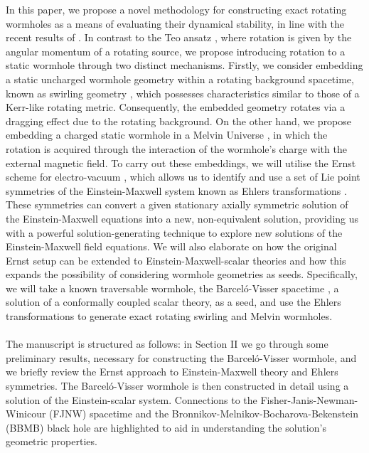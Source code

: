 \documentclass[aps,preprint,groupedaddress,nofootinbib,superscriptaddress,showkeys,showpacs,eqsecnum,amsmath,amssymb]{revtex4-1}
\begin{document}
In this paper, we propose a novel methodology for constructing exact rotating wormholes as a means of evaluating their dynamical stability, in line with the recent results of \cite{Azad:2023iju}. 
In contrast to the Teo ansatz \cite{Teo:1998dp}, where rotation is given by the angular momentum of a rotating source, we propose introducing rotation to a static wormhole through two distinct mechanisms. Firstly, we consider embedding a static uncharged wormhole geometry within a rotating background spacetime, known as swirling geometry \cite{Astorino:2022aam}, which possesses characteristics similar to those of a Kerr-like rotating metric. Consequently, the embedded geometry rotates via a dragging effect due to the rotating background. On the other hand, we propose embedding a charged static wormhole in a Melvin Universe \cite{Ernst:1976mzr}, in which the rotation is acquired through the interaction of the wormhole's charge with the external magnetic field. To carry out these embeddings, we will utilise the Ernst scheme for electro-vacuum \cite{Ernst:1967wx,Ernst:1967by}, which allows us to identify and use a set of Lie point symmetries of the Einstein-Maxwell system known as Ehlers transformations \cite{Ehlers:1957zz,Harrison:1968}. These symmetries can convert a given stationary axially symmetric solution of the Einstein-Maxwell equations into a new, non-equivalent solution, providing us with a powerful solution-generating technique to explore new solutions of the Einstein-Maxwell field equations. We will also elaborate on how the original Ernst setup can be extended to Einstein-Maxwell-scalar theories \cite{Astorino:2013xc} and how this expands the possibility of considering wormhole geometries as seeds. Specifically, we will take a known traversable wormhole, the Barcel\'o-Visser spacetime \cite{Barcelo:1999hq,Barcelo:2000zf}, a solution of a conformally coupled scalar theory, as a seed, and use the Ehlers transformations to generate exact rotating swirling and Melvin wormholes.\\
\\
The manuscript is structured as follows: in Section II we go through some preliminary results, necessary for constructing the Barcel\'o-Visser wormhole, and we briefly review the Ernst approach to Einstein-Maxwell theory and Ehlers symmetries. The Barcel\'o-Visser wormhole is then constructed in detail using a solution of the Einstein-scalar system. Connections to the  Fisher-Janis-Newman-Winicour (FJNW) spacetime \cite{Janis:1969ivo} and the Bronnikov-Melnikov-Bocharova-Bekenstein  (BBMB) black hole \cite{BBMB,Bekenstein:1974sf} are highlighted to aid in understanding the solution's geometric properties. 
\end{document}
